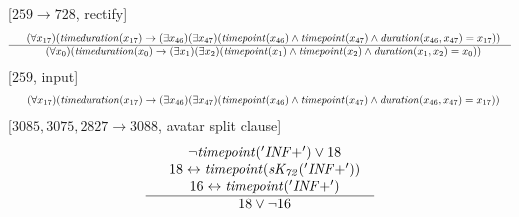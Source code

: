 \documentclass[border=10pt,preview,multi,varwidth=\maxdimen]{standalone}
\newenvironment{VampireStep}{}{}
\newenvironment{VampireInference}{%
   \begin{array}{c}}{\end{array}}
\newenvironment{VampirePremise}%
   {\begin{array}{l}}%
   {\end{array}}
\newenvironment{VampireConclusion}%
   {\begin{array}{l}}%
   {\end{array}}
\newcommand{\VPremiseSeparator}{\\}
\newcommand{\VConclusionSeparator}{\\ \hline}
\newcommand{\Vor}{\vee}
\newcommand{\Vand}{\wedge}
\newcommand{\Vimp}{\rightarrow}
\newcommand{\Viff}{\leftrightarrow}
\begin{document}
\begin{VampireStep}
[$259\rightarrow 728$, rectify]\\
\[\begin{VampireInference}
\begin{VampirePremise}%
~~(\forall x_{17} )(\mathit{timeduration} (x_{17}) \Vimp (\exists x_{46} )(\exists x_{47} )(\mathit{timepoint} (x_{46}) \Vand \mathit{timepoint} (x_{47}) \Vand \mathit{duration} (x_{46},x_{47}) = x_{17}))
\end{VampirePremise}
\VConclusionSeparator
\begin{VampireConclusion}
~~(\forall x_{0} )(\mathit{timeduration} (x_{0}) \Vimp (\exists x_{1} )(\exists x_{2} )(\mathit{timepoint} (x_{1}) \Vand \mathit{timepoint} (x_{2}) \Vand \mathit{duration} (x_{1},x_{2}) = x_{0}))
\end{VampireConclusion}
\end{VampireInference}
\]
\end{VampireStep}
\begin{VampireStep}
[$259$, input]\\
\[\begin{VampireInference}
\begin{VampireConclusion}
~~(\forall x_{17} )(\mathit{timeduration} (x_{17}) \Vimp (\exists x_{46} )(\exists x_{47} )(\mathit{timepoint} (x_{46}) \Vand \mathit{timepoint} (x_{47}) \Vand \mathit{duration} (x_{46},x_{47}) = x_{17}))
\end{VampireConclusion}
\end{VampireInference}
\]
\end{VampireStep}
\begin{VampireStep}
[$3085,3075,2827\rightarrow 3088$, avatar split clause]\\
\[\begin{VampireInference}
\begin{VampirePremise}%
~~\neg \mathit{timepoint} (\mathit{'INF+'}) \Vor 18
\end{VampirePremise}
\VPremiseSeparator
\begin{VampirePremise}%
~~18 \Viff \mathit{timepoint} (\mathit{sK_{72}} (\mathit{'INF+'}))
\end{VampirePremise}
\VPremiseSeparator
\begin{VampirePremise}%
~~16 \Viff \mathit{timepoint} (\mathit{'INF+'})
\end{VampirePremise}
\VConclusionSeparator
\begin{VampireConclusion}
~~18 \Vor  \neg 16
\end{VampireConclusion}
\end{VampireInference}
\]
\end{VampireStep}
\end{document}
